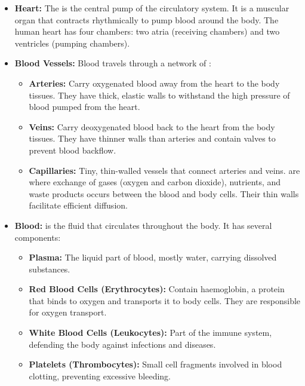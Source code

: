 \begin{itemize}
    \item \textbf{Heart:}  The  is the central pump of the circulatory system.  It is a muscular organ that contracts rhythmically to pump blood around the body.  The human heart has four chambers: two atria (receiving chambers) and two ventricles (pumping chambers).

    \item \textbf{Blood Vessels:}  Blood travels through a network of :
    \begin{itemize}
        \item \textbf{Arteries:}  Carry oxygenated blood away from the heart to the body tissues.  They have thick, elastic walls to withstand the high pressure of blood pumped from the heart.
        \item \textbf{Veins:}  Carry deoxygenated blood back to the heart from the body tissues.  They have thinner walls than arteries and contain valves to prevent blood backflow.
        \item \textbf{Capillaries:}  Tiny, thin-walled vessels that connect arteries and veins.  are where exchange of gases (oxygen and carbon dioxide), nutrients, and waste products occurs between the blood and body cells. Their thin walls facilitate efficient diffusion.
    \end{itemize}

    \item \textbf{Blood:}   is the fluid that circulates throughout the body. It has several components:
    \begin{itemize}
        \item \textbf{Plasma:}  The liquid part of blood, mostly water, carrying dissolved substances.
        \item \textbf{Red Blood Cells (Erythrocytes):}  Contain haemoglobin, a protein that binds to oxygen and transports it to body cells.  They are responsible for oxygen transport.
        \item \textbf{White Blood Cells (Leukocytes):}  Part of the immune system, defending the body against infections and diseases.
        \item \textbf{Platelets (Thrombocytes):}  Small cell fragments involved in blood clotting, preventing excessive bleeding.
    \end{itemize}


\end{itemize}
